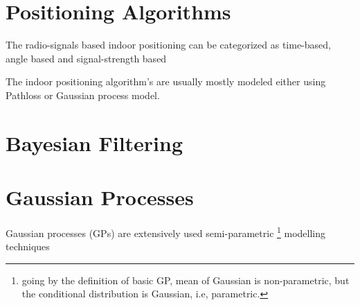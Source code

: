 \section{Positioning Algorithms} \label{2_ind_pos}

The radio-signals based indoor positioning can be categorized as time-based, angle based and signal-strength based \citep{atia}

The indoor positioning algorithm's are usually mostly modeled either using Pathloss  or Gaussian process model. 



\section{Bayesian Filtering} \label{2_bayes_filter}



\begin{table}[htb]
        \caption{I'm your sample table \label{taulukko1}}
\begin{center}
\end{center}
\end{table}

\section{Gaussian Processes} \label{2_gp}

Gaussian processes (GPs) are extensively used semi-parametric \footnote{going by the definition of basic GP, mean of Gaussian is non-parametric, but the conditional distribution is Gaussian, i.e, parametric.} modelling techniques 





\clearpage
